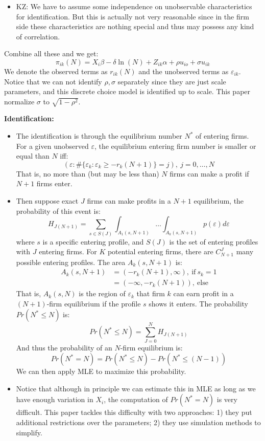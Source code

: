 \documentclass{book}
\theoremstyle{plain}
\theoremstyle{definition}
\begin{document}
\begin{itemize}
\begin{itemize}
		\item KZ: We have to assume some independence on unobservable characteristics for identification. 
		But this is actually not very reasonable since in the firm side these characteristics are nothing special and thus may possess any kind of correlation.
	\end{itemize}
	Combine all these and we get:
	\[\pi_{ik}(N)=X_i\beta-\delta \ln(N)+Z_{ik}\alpha
	+\rho u_{io}+\sigma u_{ik} \tag{4}\]
	We denote the observed terms as $r_{ik}(N)$ and the unobserved terms as $\varepsilon_{ik}$.
	Notice that we can not identify $\rho, \sigma$ separately since they are just scale parameters, and this discrete choice model is identified up to scale.
	This paper normalize $\sigma$ to $\sqrt{1-\rho^2}$.
\end{itemize}

\vspace{1em}
\noindent
\textbf{Identification:}
\begin{itemize}
	\item The identification is through the equilibrium number $N^*$ of entering firms.
	For a given unobserved $\varepsilon$, the equilibrium entering firm number is smaller or equal than $N$ iff:
	\[(\varepsilon:\# \{\varepsilon_k:
	\varepsilon_k \geq -r_k(N+1)\}=j)
	,\ j=0,\dots,N\]
	That is, no more than (but may be less than) $N$ firms can make a profit if $N+1$ firms enter.

	\item Then suppose exact $J$ firms can make profits in a $N+1$ equilibrium, the probability of this event is:
	\[H_{J(N+1)}=\sum_{s\in S(J)}
	\int_{A_1(s,N+1)} \dots \int_{A_k(s,N+1)}
	p(\varepsilon)d \varepsilon\]
	where $s$ is a specific entering profile, and $S(J)$ is the set of entering profiles with $J$ entering firms.
	For $K$ potential entering firms, there are $C_{N+1}^J$ many possible entering profiles.
	The area $A_k(s,N+1)$ is:
	\begin{align*}
	A_k(s,N+1)&=(-r_k(N+1),\infty),\ \text{if}\ s_k=1\\
	&= (-\infty,-r_k(N+1)),\ \text{else}
	\end{align*}
	That is, $A_k(s,N)$ is the region of $\varepsilon_k$ that firm $k$ can earn profit in a $(N+1)$-firm equilibrium if the profile $s$ shows it enters.
	The probability $Pr(N^*\leq N)$ is:
	\[Pr(N^* \leq N)= \sum_{J=0}^N H_{J(N+1)}\]
	And thus the probability of an $N$-firm equilibrium is:
	\[Pr(N^* = N)=Pr(N^* \leq N)-Pr(N^* \leq (N-1))\]
	We can then apply MLE to maximize this probability.

	\item Notice that although in principle we can estimate this in MLE as long as we have enough variation in $X_i$, the computation of $Pr(N^*=N)$ is very difficult.
	This paper tackles this difficulty with two approaches: 1) they put additional restrictions over the parameters; 2) they use simulation methods to simplify.
\end{itemize}
\end{document}
